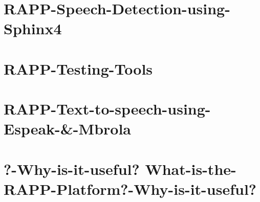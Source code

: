 \documentclass[twoside]{book}
\begin{document}
\chapter{R\-A\-P\-P-\/\-Speech-\/\-Detection-\/using-\/\-Sphinx4}
\label{md_rapp-platform_8wiki_RAPP-Speech-Detection-using-Sphinx4}
\hypertarget{md_rapp-platform_8wiki_RAPP-Speech-Detection-using-Sphinx4}{}

\chapter{R\-A\-P\-P-\/\-Testing-\/\-Tools}
\label{md_rapp-platform_8wiki_RAPP-Testing-Tools}
\hypertarget{md_rapp-platform_8wiki_RAPP-Testing-Tools}{}

\chapter{R\-A\-P\-P-\/\-Text-\/to-\/speech-\/using-\/\-Espeak-\/\&-\/\-Mbrola}
\label{md_rapp-platform_8wiki_RAPP-Text-to-speech-using-Espeak-_6-Mbrola}
\hypertarget{md_rapp-platform_8wiki_RAPP-Text-to-speech-using-Espeak-_6-Mbrola}{}

\chapter{?-\/\-Why-\/is-\/it-\/useful? What-\/is-\/the-\/\-R\-A\-P\-P-\/\-Platform?-\/\-Why-\/is-\/it-\/useful?}
\label{md_rapp-platform_8wiki_What-is-the-RAPP-Platform}
\hypertarget{md_rapp-platform_8wiki_What-is-the-RAPP-Platform}{}


\newpage
{}
{}
\printindex
\end{document}
